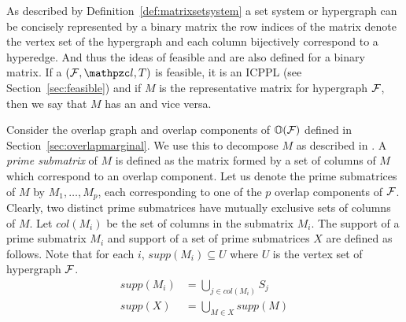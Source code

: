 




As described by Definition~\ref{def:matrixsetsystem} a set system or
hypergraph can be concisely represented by a binary matrix \stt the
row indices of the matrix denote the vertex set of the hypergraph and
each column bijectively correspond to a hyperedge. And thus the ideas
of feasible \TPL and \ICPPL are also defined for a binary matrix. If a
\TPL $(\cF,\cl,T)$ is feasible, \ie it is an ICPPL (see
Section~\ref{sec:feasible}) and if $M$ is the representative matrix
for hypergraph ${\cal F}$, then we say that $M$ has an \ICPPL and vice
versa.

Consider the overlap graph and overlap components of $\mathbb O({\cal F})$
defined in Section~\ref{sec:overlapmarginal}.  We use this to
decompose $M$ as described in \cite{wlh02,nsnrs09}.  A {\em prime
  submatrix} of $M$ is defined as the matrix formed by a set of
columns of $M$ which correspond to an overlap component.  Let us
denote the prime submatrices of $M$ by $M_1,\ldots,M_p$, each
corresponding to one of the $p$ overlap components of ${\cal F}$. Clearly,
two distinct prime submatrices have mutually exclusive sets of columns
of $M$.  Let $col(M_i)$ be the set of columns in the submatrix $M_i$.
The support of a prime submatrix $M_i$ and support of a set of prime
submatrices $X$ are defined as follows. Note that for each $i$,
$supp(M_i) \subseteq U$ where $U$ is the vertex set of hypergraph
${\cal F}$.
\begin{align*}
supp(M_i) &= \displaystyle \bigcup_{j \in col(M_i)}S_j\\  
supp(X) &= \displaystyle  \bigcup_{M \in X} supp(M)
\end{align*}



